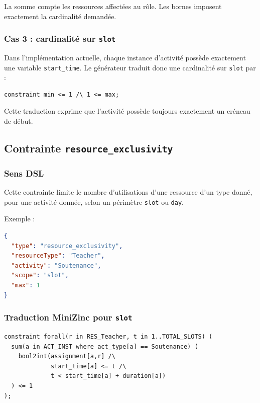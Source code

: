 \documentclass[12pt,a4paper]{article}
\begin{document}
La somme compte les ressources affectées au rôle. Les bornes imposent exactement la cardinalité demandée.

\subsubsection*{Cas 3 : cardinalité sur \texttt{slot}}

Dans l'implémentation actuelle, chaque instance d'activité possède exactement une variable \texttt{start\_time}. Le générateur traduit donc une cardinalité sur \texttt{slot} par :

\begin{lstlisting}[language=MiniZinc]
constraint min <= 1 /\ 1 <= max;
\end{lstlisting}

Cette traduction exprime que l'activité possède toujours exactement un créneau de début.

\subsection{Contrainte \texttt{resource\_exclusivity}}

\subsubsection*{Sens DSL}

Cette contrainte limite le nombre d'utilisations d'une ressource d'un type donné, pour une activité donnée, selon un périmètre \texttt{slot} ou \texttt{day}.

Exemple :

\begin{lstlisting}[language=JSON]
{
  "type": "resource_exclusivity",
  "resourceType": "Teacher",
  "activity": "Soutenance",
  "scope": "slot",
  "max": 1
}
\end{lstlisting}

\subsubsection*{Traduction MiniZinc pour \texttt{slot}}

\begin{lstlisting}[language=MiniZinc]
constraint forall(r in RES_Teacher, t in 1..TOTAL_SLOTS) (
  sum(a in ACT_INST where act_type[a] == Soutenance) (
    bool2int(assignment[a,r] /\
             start_time[a] <= t /\
             t < start_time[a] + duration[a])
  ) <= 1
);
\end{lstlisting}
\end{document}
